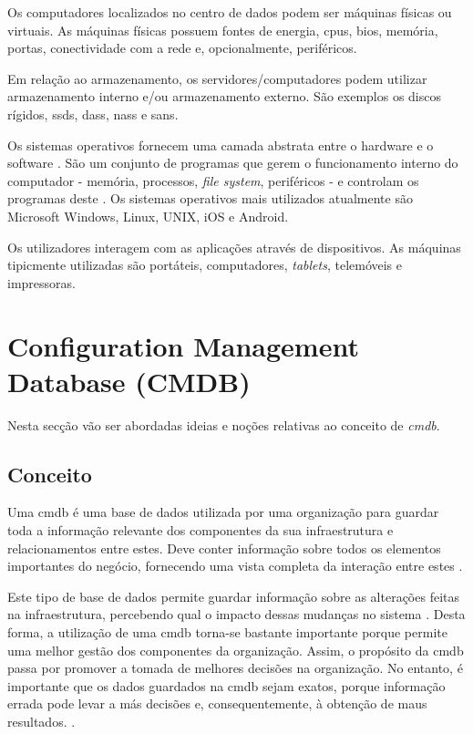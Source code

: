 \documentclass[
  oneside,
  11pt, a4paper,
  footinclude=true,
  headinclude=true,
  cleardoublepage=empty
]{scrbook}
\begin{document}
Os computadores localizados no centro de dados podem ser máquinas físicas ou virtuais. As máquinas físicas possuem fontes de energia, \glspl{cpu}, \gls{bios}, memória, portas, conectividade com a rede e, opcionalmente, periféricos.

Em relação ao armazenamento, os servidores/computadores podem utilizar armazenamento interno e/ou armazenamento externo. São exemplos os discos rígidos, \glspl{ssd}, \glspl{das}, \glspl{nas} e \glspl{san}.

Os sistemas operativos fornecem uma camada abstrata entre o hardware e o software \cite{infrastructure}. São um conjunto de programas que gerem o funcionamento interno do computador - memória, processos, \textit{file system}, periféricos - e controlam os programas deste \cite{owen2019operation}. Os sistemas operativos mais utilizados atualmente são Microsoft Windows, Linux, UNIX, iOS e Android.

Os utilizadores interagem com as aplicações através de dispositivos. As máquinas tipicmente utilizadas são portáteis, computadores, \textit{tablets}, telemóveis e impressoras.

\section{Configuration Management Database (CMDB)}

Nesta secção vão ser abordadas ideias e noções relativas ao conceito de \textit{\acrlong{cmdb}}.

\subsection{Conceito}

Uma \gls{cmdb} é uma base de dados utilizada por uma organização para guardar toda a informação relevante dos componentes da sua infraestrutura e relacionamentos entre estes. Deve conter informação sobre todos os elementos importantes do negócio, fornecendo uma vista completa da interação entre estes \cite{baron2010configuration}.

Este tipo de base de dados permite guardar informação sobre as alterações feitas na infraestrutura, percebendo qual o impacto dessas mudanças no sistema \cite{faihe2011configuration} \cite{cmdbsystems}. Desta forma, a utilização de uma \gls{cmdb} torna-se bastante importante porque permite uma melhor gestão dos componentes da organização. Assim, o propósito da \gls{cmdb} passa por promover a tomada de melhores decisões na organização. No entanto, é importante que os dados guardados na \gls{cmdb} sejam exatos, porque informação errada pode levar a más decisões e, consequentemente, à obtenção de maus resultados. \cite{cmdbsystems}.
\end{document}
